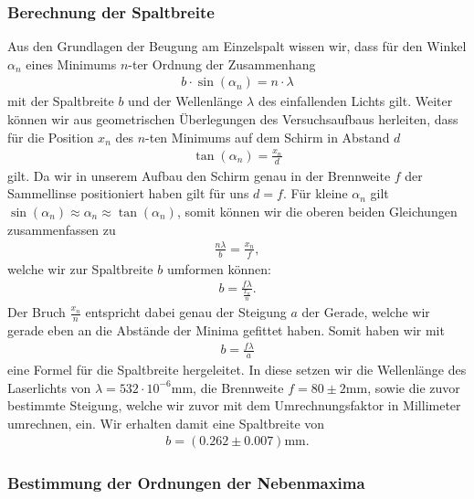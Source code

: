 \subsubsection*{Berechnung der Spaltbreite}

Aus den Grundlagen der Beugung am Einzelspalt wissen wir, dass für den Winkel $\alpha_n$ eines Minimums $n$-ter Ordnung der Zusammenhang
\begin{align}
  b \cdot \sin(\alpha_n) = n \cdot \lambda
\end{align}
mit der Spaltbreite $b$ und der Wellenlänge $\lambda$ des einfallenden Lichts gilt. Weiter können wir aus geometrischen Überlegungen des Versuchsaufbaus herleiten, dass für die Position $x_n$ des $n$-ten Minimums auf dem Schirm in Abstand $d$
\begin{align}
  \tan(\alpha_n) = \frac{x_n}{d}
\end{align}
gilt. Da wir in unserem Aufbau den Schirm genau in der Brennweite $f$ der Sammellinse positioniert haben gilt für uns $d = f$. Für kleine $\alpha_n$ gilt $\sin(\alpha_n) \approx \alpha_n \approx \tan(\alpha_n)$, somit können wir die oberen beiden Gleichungen zusammenfassen zu
\begin{align}
  \frac{n\lambda}{b} = \frac{x_n}{f},
\end{align}
welche wir zur Spaltbreite $b$ umformen können:
\begin{align}
  b = \frac{f \lambda}{\frac{x_n}{n}}.
\end{align}
Der Bruch $\frac{x_n}{n}$ entspricht dabei genau der Steigung $a$ der Gerade, welche wir gerade eben an die Abstände der Minima gefittet haben. Somit haben wir mit
\begin{align}
  b = \frac{f\lambda}{a}
\end{align}
eine Formel für die Spaltbreite hergeleitet. In diese setzen wir die Wellenlänge des Laserlichts von $\lambda = 532 \cdot 10^{-6} \si{\milli\meter}$, die Brennweite $f = 80 \pm 2 \si{\milli\meter}$, sowie die zuvor bestimmte Steigung, welche wir zuvor mit dem Umrechnungsfaktor in Millimeter umrechnen, ein. Wir erhalten damit eine Spaltbreite von
\begin{align}
  b = (0.262 \pm 0.007)\si{\milli\meter}.
\end{align}

\subsubsection*{Bestimmung der Ordnungen der Nebenmaxima}

